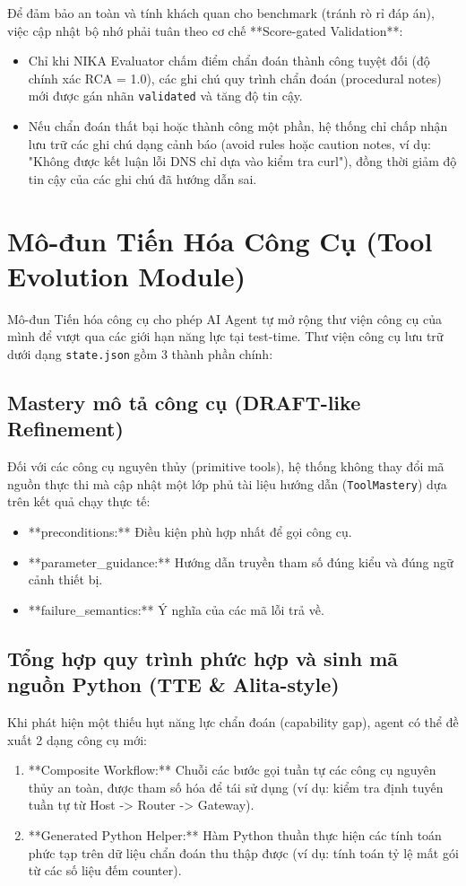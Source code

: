 Để đảm bảo an toàn và tính khách quan cho benchmark (tránh rò rỉ đáp án), việc cập nhật bộ nhớ phải tuân theo cơ chế **Score-gated Validation**:
\begin{itemize}
    \item Chỉ khi NIKA Evaluator chấm điểm chẩn đoán thành công tuyệt đối (độ chính xác RCA = 1.0), các ghi chú quy trình chẩn đoán (procedural notes) mới được gán nhãn \texttt{validated} và tăng độ tin cậy.
    \item Nếu chẩn đoán thất bại hoặc thành công một phần, hệ thống chỉ chấp nhận lưu trữ các ghi chú dạng cảnh báo (avoid rules hoặc caution notes, ví dụ: "Không được kết luận lỗi DNS chỉ dựa vào kiểm tra curl"), đồng thời giảm độ tin cậy của các ghi chú đã hướng dẫn sai.
\end{itemize}

\section{Mô-đun Tiến Hóa Công Cụ (Tool Evolution Module)}
\label{sec:tool_evolution}

Mô-đun Tiến hóa công cụ cho phép AI Agent tự mở rộng thư viện công cụ của mình để vượt qua các giới hạn năng lực tại test-time. Thư viện công cụ lưu trữ dưới dạng \texttt{state.json} gồm 3 thành phần chính:

\subsection{Mastery mô tả công cụ (DRAFT-like Refinement)}
Đối với các công cụ nguyên thủy (primitive tools), hệ thống không thay đổi mã nguồn thực thi mà cập nhật một lớp phủ tài liệu hướng dẫn (\texttt{ToolMastery}) dựa trên kết quả chạy thực tế:
\begin{itemize}
    \item **preconditions:** Điều kiện phù hợp nhất để gọi công cụ.
    \item **parameter\_guidance:** Hướng dẫn truyền tham số đúng kiểu và đúng ngữ cảnh thiết bị.
    \item **failure\_semantics:** Ý nghĩa của các mã lỗi trả về.
\end{itemize}

\subsection{Tổng hợp quy trình phức hợp và sinh mã nguồn Python (TTE \& Alita-style)}
Khi phát hiện một thiếu hụt năng lực chẩn đoán (capability gap), agent có thể đề xuất 2 dạng công cụ mới:
\begin{enumerate}
    \item **Composite Workflow:** Chuỗi các bước gọi tuần tự các công cụ nguyên thủy an toàn, được tham số hóa để tái sử dụng (ví dụ: kiểm tra định tuyến tuần tự từ Host -> Router -> Gateway).
    \item **Generated Python Helper:** Hàm Python thuần thực hiện các tính toán phức tạp trên dữ liệu chẩn đoán thu thập được (ví dụ: tính toán tỷ lệ mất gói từ các số liệu đếm counter).
\end{enumerate}

